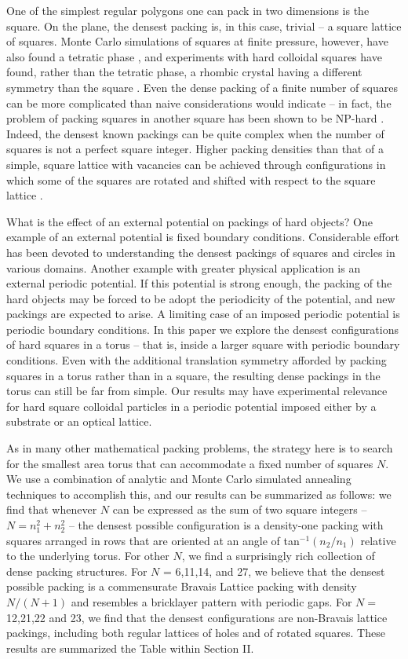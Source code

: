 \documentclass[aps]{revtex4}
\begin{document}
One of the simplest regular polygons one can pack in two dimensions is the square. On the plane, the densest packing is, in this case, trivial -- a square lattice of squares. Monte Carlo simulations of squares at finite pressure, however, have also found a tetratic phase \cite{Donev2006,Wojciechowski2004}, and experiments with hard colloidal squares have found, rather than the tetratic phase, a rhombic crystal having a different symmetry than the square \cite{Zhao2011}. Even the dense packing of a finite number of squares can be more complicated than naive considerations would indicate -- in fact, the problem of packing squares in another square has been shown to be NP-hard \cite{Leung1990}. Indeed, the densest known packings can be quite complex \cite{ERDOS1975,Friedman2002} when the number of squares is not a perfect square integer. Higher packing densities than that of a simple, square lattice with vacancies can be achieved through configurations in which some of the squares are rotated and shifted with respect to the square lattice \cite{Friedman2002}.

What is the effect of an external potential on packings of hard objects? One example of an external potential is fixed boundary conditions.  Considerable effort has been devoted to understanding the densest packings of squares and circles in various domains.  Another example with greater physical application is an external periodic potential.  If this potential is strong enough, the packing of the hard objects may be forced to be adopt the periodicity of the potential, and new packings are expected to arise.  A limiting case of an imposed periodic potential is periodic boundary conditions.  In this paper we explore the densest configurations of hard squares in a torus -- that is, inside a larger square with periodic boundary conditions.  Even with the additional translation symmetry afforded by packing squares in a torus rather than in a square, the resulting dense packings in the torus can still be far from simple. Our results may have experimental relevance for hard square colloidal particles in a periodic potential imposed either by a substrate or an optical lattice.

As in many other mathematical packing problems, the strategy here is to search for the smallest area torus that can accommodate a fixed number of squares $N$.  We use a combination of analytic and Monte Carlo simulated annealing techniques to accomplish this, and our results can be summarized as follows: we find that whenever $N$ can be expressed as the sum of two square integers -- $N=n_1^2+n_2^2$ -- the densest possible configuration is a density-one packing with squares arranged in rows that are oriented at an angle of tan$^{-1}(n_2/n_1)$ relative to the underlying torus.  For other $N$, we find a surprisingly rich collection of dense packing structures. For $N$ = 6,11,14, and 27, we believe that the densest possible packing is a commensurate Bravais Lattice packing with density $N/(N+1)$ and resembles a bricklayer pattern with periodic gaps.  For $N=$ 12,21,22 and 23, we find that the densest configurations are non-Bravais lattice packings, including both regular lattices of holes and of rotated squares. These results are summarized the Table within Section II.
\end{document}
